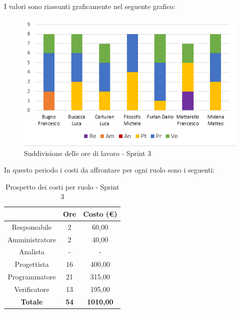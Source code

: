I valori sono riassunti graficamente nel seguente grafico:

\begin{figure}[H]
  \centering
  \includegraphics[scale=1.0]{immagini/3Sprint_oreLavoro.png}
  \caption{Suddivisione delle ore di lavoro - Sprint 3}
\end{figure}

\pagebreak
In questo periodo i costi da affrontare per ogni ruolo sono i seguenti:

\begin{table}[H]
  \centering
  \renewcommand{\arraystretch}{1.8}
  \begin{tabular}{c|c|c}
    \rowcolor[HTML]{125E28}
    \multicolumn{1}{c}{\color[HTML]{FFFFFF}\textbf{Ruolo}}
                    & \multicolumn{1}{c}{\color[HTML]{FFFFFF}\textbf{Ore}}
                    & \multicolumn{1}{c}{\color[HTML]{FFFFFF}\textbf{Costo (€)}}                    \\
    \hline
    Responsabile    & 2                                                          & 60,00            \\
    Amministratore  & 2                                                          & 40,00            \\
    Analista        & -                                                          & -                \\
    Progettista     & 16                                                         & 400,00           \\
    Programmatore   & 21                                                         & 315,00           \\
    Verificatore    & 13                                                         & 195,00           \\
    \textbf{Totale} & \textbf{54}                                                & \textbf{1010,00}
  \end{tabular}
  \caption{Prospetto dei costi per ruolo - Sprint 3}
\end{table}

